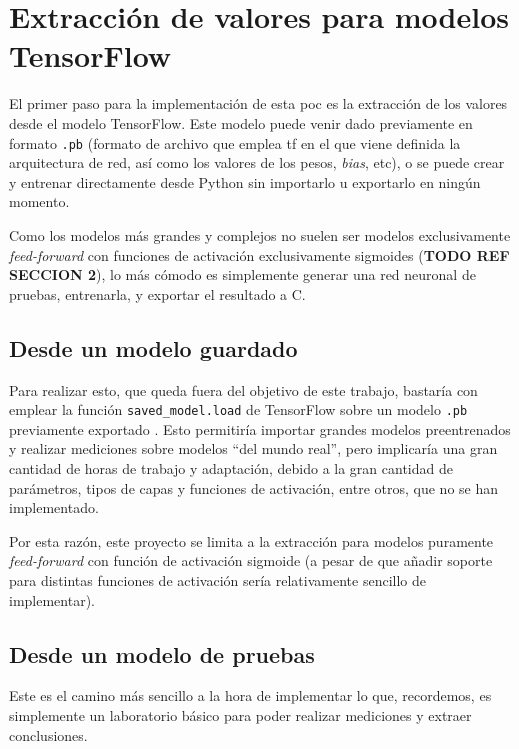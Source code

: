 \section{Extracción de valores para modelos TensorFlow}
\label{sec:extraccion_valores_modelo_tf}
El primer paso para la implementación de esta \acrshort{poc} es la extracción de los valores desde el modelo TensorFlow. Este modelo puede venir dado previamente en formato \texttt{.pb} (formato de archivo que emplea \acrlong{tf} en el que viene definida la arquitectura de red, así como los valores de los pesos, \textit{bias}, etc), o se puede crear y entrenar directamente desde Python sin importarlo u exportarlo en ningún momento.

Como los modelos más grandes y complejos no suelen ser modelos exclusivamente \textit{feed-forward} con funciones de activación exclusivamente sigmoides (\textbf{TODO REF SECCION 2}), lo más cómodo es simplemente generar una red neuronal de pruebas, entrenarla, y exportar el resultado a C.

\subsection{Desde un modelo guardado}
\label{ssec:desde_modelo_guardado}
Para realizar esto, que queda fuera del objetivo de este trabajo, bastaría con emplear la función \texttt{saved\_model.load} de TensorFlow sobre un modelo \texttt{.pb} previamente exportado \cite{tensorflow_saved_model}. Esto permitiría importar grandes modelos preentrenados y realizar mediciones sobre modelos ``del mundo real'', pero implicaría una gran cantidad de horas de trabajo y adaptación, debido a la gran cantidad de parámetros, tipos de capas y funciones de activación, entre otros, que no se han implementado.

Por esta razón, este proyecto se limita a la extracción para modelos puramente \textit{feed-forward} con función de activación sigmoide (a pesar de que añadir soporte para distintas funciones de activación sería relativamente sencillo de implementar).

\subsection{Desde un modelo de pruebas}
\label{ssec:desde_modelo_de_pruebas}
Este es el camino más sencillo a la hora de implementar lo que, recordemos, es simplemente un laboratorio básico para poder realizar mediciones y extraer conclusiones.

